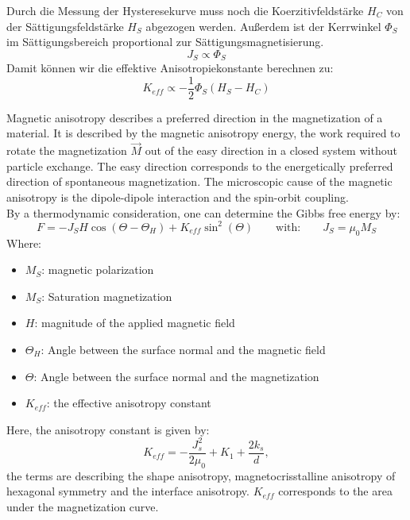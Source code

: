 Durch die Messung der Hysteresekurve muss noch die Koerzitivfeldstärke $H_C$ von der Sättigungsfeldstärke $H_S$ abgezogen werden. Außerdem ist der Kerrwinkel $\Phi_S$ im Sättigungsbereich proportional zur Sättigungsmagnetisierung. 
\begin{equation}
    J_S \propto \Phi_S
\end{equation}
Damit können wir die effektive Anisotropiekonstante berechnen zu:
\begin{equation}
    K_{eff} \propto -\frac{1}{2}\Phi_S(H_S-H_C)
\end{equation}



Magnetic anisotropy describes a preferred direction in the magnetization of a material.  It is described by the magnetic anisotropy energy, the work required to rotate the magnetization $\Vec{M}$ out of the easy direction in a closed system without particle exchange. The easy direction corresponds to the energetically preferred direction of spontaneous magnetization. The microscopic cause of the magnetic anisotropy is the dipole-dipole interaction and the spin-orbit coupling. \\
By a thermodynamic consideration, one can determine the Gibbs free energy by:
\begin{equation}
    F = -J_SH\cos(\Theta-\Theta_H) + K_{eff} \sin^2(\Theta) \qquad \text{with:} \qquad J_S = \mu_0M_S
\end{equation}
Where:
\begin{itemize}
    \item $M_S$: magnetic polarization
    \item $M_S$: Saturation magnetization
    \item $H$: magnitude of the applied magnetic field
    \item $\Theta_H$: Angle between the surface normal and the magnetic field
    \item $\Theta$: Angle between the surface normal and the magnetization
    \item $K_{eff}$: the effective anisotropy constant
\end{itemize}
Here, the anisotropy constant is given by:
\begin{equation}
    K_{eff} = -\frac{J_s^2}{2\mu_0}+K_1+\frac{2k_s}{d},
\end{equation}
the terms are describing the shape anisotropy, magnetocrisstalline anisotropy of hexagonal symmetry and the interface anisotropy. $K_{eff}$ corresponds to the area under the magnetization curve. \\
